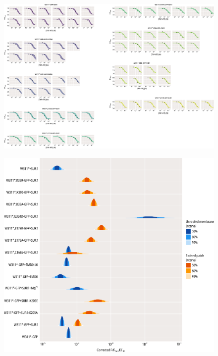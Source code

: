 \begin{figure}[h]
	\centering
	\includegraphics[width=\textwidth]{all_pcf_fits_4.pdf}
	\caption[Excised patch quenching sample hill fits]{
	}
	\label{apxfig:pcf_2}
\end{figure}

\begin{figure}[h]
	\centering
	\includegraphics[width=\textwidth]{all_binding_params.pdf}
	\caption[Fluorescence quenching EC\textsubscript{50} posterior distributions]{
	}
	\label{apxfig:binding_params}
\end{figure}

